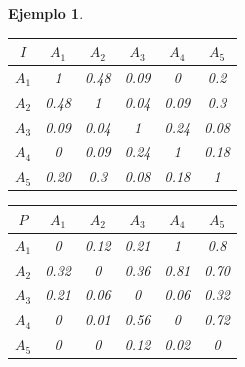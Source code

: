 \documentclass[a5paper,doc,10pt,noapacite]{apa6}
\newtheorem{ejem}{Ejemplo}
\begin{document}
{{\begin{ejem}
\begin{table}[H]
   \fontsize{7}{11}\selectfont
    \begin{minipage}{.5\linewidth}
      \centering
	\begin{tabular}{c|ccccc} \thickline
	\(I\) & \(A_1\) & \(A_2\) & \(A_3\) & \(A_4\) & \(A_5\)  \\ \hline
    \(A_1\) & 1 & 0.48 & 0.09 & 0 & 0.2  \\
    \(A_2\) & 0.48 & 1 & 0.04 & 0.09 & 0.3  \\
	\(A_3\) & 0.09 & 0.04 & 1 & 0.24 & 0.08   \\
	\(A_4\) & 0 & 0.09 & 0.24 & 1 & 0.18   \\
	\(A_5\) & 0.20 & 0.3 & 0.08 & 0.18 & 1   \\
\end{tabular}
\label{tab:B4} 
    \end{minipage}%
    \begin{minipage}{.5\linewidth}
      \centering
	\begin{tabular}{c|ccccc} \thickline
	\(P\) & \(A_1\) & \(A_2\) & \(A_3\) & \(A_4\) & \(A_5\)  \\ \hline
    \(A_1\) & 0 & 0.12 & 0.21 & 1 & 0.8  \\
    \(A_2\) & 0.32 & 0 & 0.36 & 0.81 & 0.70  \\
	\(A_3\) & 0.21 & 0.06 & 0 & 0.06 & 0.32   \\
	\(A_4\) & 0 & 0.01 & 0.56 & 0 & 0.72   \\
	\(A_5\) & 0 & 0 & 0.12 & 0.02 & 0   \\
\end{tabular}
\label{tab:B5} 
    \end{minipage} 
\end{table}

%


\end{ejem}}}
\end{document}
